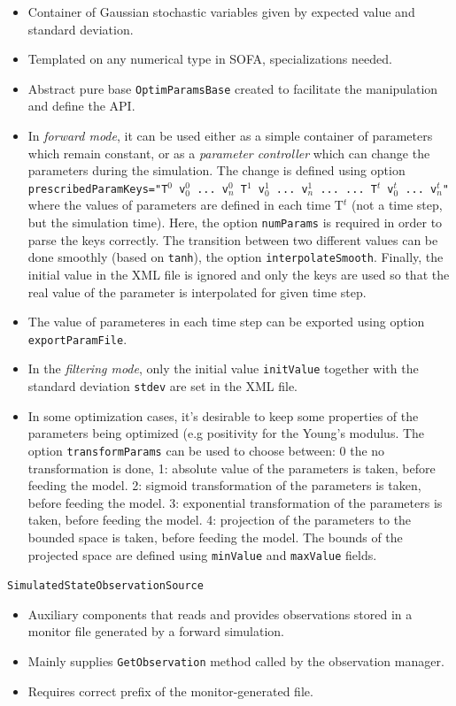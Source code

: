 \documentclass[10pt]{article}
\begin{document}
\begin{itemize}
\item Container of Gaussian stochastic variables given by expected value and standard deviation.
\item Templated on any numerical type in SOFA, specializations needed.
\item Abstract pure base \texttt{OptimParamsBase} created to facilitate the manipulation and define the API.
\item In \emph{forward mode}, it can be used either as a simple container of parameters which remain constant, or as a \emph{parameter controller} which can change 
the parameters during the simulation. The change is defined using option \texttt{prescribedParamKeys="T$^0$ v$_0^0$ ... v$_n^0$  T$^1$ v$_0^1$ ... v$_n^1$ ... ... T$^t$ v$^t_0$ ... v$^t_n$"} where the 
values of parameters are defined in each time T$^t$ (not a time step, but the simulation time). Here, the option \texttt{numParams} is required in order to parse the keys correctly. 
The transition between two different values can be done smoothly (based on \texttt{tanh}), the option \texttt{interpolateSmooth}.
Finally, the initial value in the XML  file is ignored and only the keys are used so that the 
real value of the parameter is interpolated for given time step.
\item The value of parameteres in each time step can be exported using option \texttt{exportParamFile}.
\item In the \emph{filtering mode}, only the initial value \texttt{initValue} together with the standard deviation \texttt{stdev} are set in the XML file.
\item In some optimization cases, it's desirable to keep some properties of the parameters being optimized (e.g positivity for the Young's modulus. The option \texttt{transformParams} can be used to choose between: 0 the no transformation is done, 1: absolute value of the parameters is taken, before feeding the model. 2: sigmoid transformation of the parameters is taken, before feeding the model. 3: exponential transformation of the parameters is taken, before feeding the model. 4: projection of the parameters to the bounded space is taken, before feeding the model. The bounds of the projected space are defined using \texttt{minValue} and \texttt{maxValue} fields.
\end{itemize}
\medskip
{\large\texttt{SimulatedStateObservationSource}}
\begin{itemize}
\item Auxiliary components that reads and provides observations stored in a monitor file generated by a forward simulation.
\item Mainly supplies \texttt{GetObservation} method called by the observation manager. 
\item Requires correct prefix of the monitor-generated file. 
\end{itemize}
\end{document}

